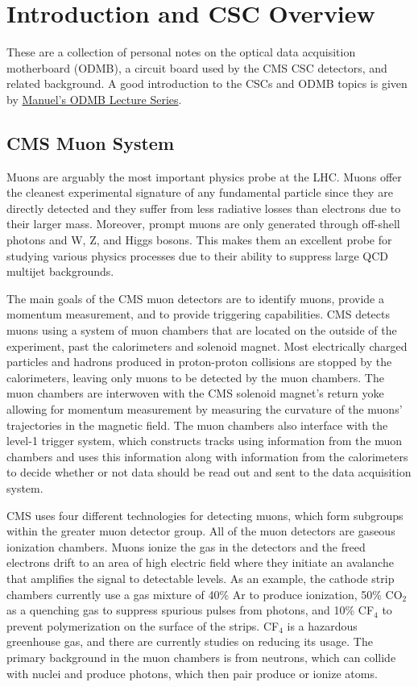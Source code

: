 \documentclass[10pt,a4paper]{article}
\begin{document}

\section{Introduction and CSC Overview}

These are a collection of personal notes on the optical data acquisition motherboard (ODMB), a circuit board used by the CMS CSC detectors, and related background. A good introduction to the CSCs and ODMB topics is given by \href{https://indico.cern.ch/event/750612/}{Manuel's ODMB Lecture Series}.

\subsection{CMS Muon System}

Muons are arguably the most important physics probe at the LHC. Muons offer the cleanest experimental signature of any fundamental particle since they are directly detected and they suffer from less radiative losses than electrons due to their larger mass. Moreover, prompt muons are only generated through off-shell photons and W, Z, and Higgs bosons. This makes them an excellent probe for studying various physics processes due to their ability to suppress large QCD multijet backgrounds.

The main goals of the CMS muon detectors are to identify muons, provide a momentum measurement, and to provide triggering capabilities. CMS detects muons using a system of muon chambers that are located on the outside of the experiment, past the calorimeters and solenoid magnet. Most electrically charged particles and hadrons produced in proton-proton collisions are stopped by the calorimeters, leaving only muons to be detected by the muon chambers. The muon chambers are interwoven with the CMS solenoid magnet's return yoke allowing for momentum measurement by measuring the curvature of the muons' trajectories in the magnetic field. The muon chambers also interface with the level-1 trigger system, which constructs tracks using information from the muon chambers and uses this information along with information from the calorimeters to decide whether or not data should be read out and sent to the data acquisition system.

CMS uses four different technologies for detecting muons, which form subgroups within the greater muon detector group. All of the muon detectors are gaseous ionization chambers. Muons ionize the gas in the detectors and the freed electrons drift to an area of high electric field where they initiate an avalanche that amplifies the signal to detectable levels. As an example, the cathode strip chambers currently use a gas mixture of 40\% Ar to produce ionization, 50\% CO$_2$ as a quenching gas to suppress spurious pulses from photons, and 10\% CF$_4$ to prevent polymerization on the surface of the strips. CF$_4$ is a hazardous greenhouse gas, and there are currently studies on reducing its usage. The primary background in the muon chambers is from neutrons, which can collide with nuclei and produce photons, which then pair produce or ionize atoms.
\end{document}
